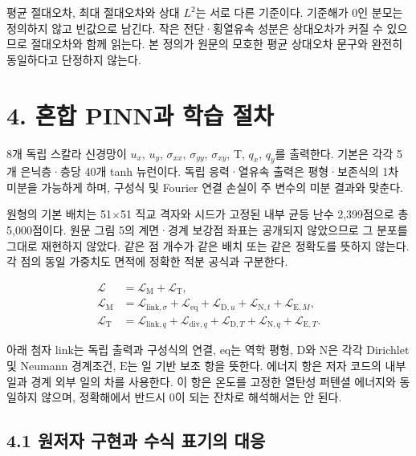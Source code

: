 \documentclass[10pt,a4paper]{article}
\begin{document}
평균 절대오차, 최대 절대오차와 상대 $L^2$는 서로 다른 기준이다. 기준해가 0인 분모는 정의하지 않고 빈값으로 남긴다. 작은 전단·횡열유속 성분은 상대오차가 커질 수 있으므로 절대오차와 함께 읽는다. 본 정의가 원문의 모호한 평균 상대오차 문구와 완전히 동일하다고 단정하지 않는다.\par

\clearpage

\section{4. 혼합 PINN과 학습 절차}

8개 독립 스칼라 신경망이 $u_x$, $u_y$, $\sigma_{xx}$, $\sigma_{yy}$, $\sigma_{xy}$, T, $q_x$, $q_y$를 출력한다. 기본은 각각 5개 은닉층·층당 40개 tanh 뉴런이다. 독립 응력·열유속 출력은 평형·보존식의 1차 미분을 가능하게 하며, 구성식 및 Fourier 연결 손실이 주 변수의 미분 결과와 맞춘다.\par

{\small\color{muted} 원형의 기본 배치는 51$\times$51 직교 격자와 시드가 고정된 내부 균등 난수 2,399점으로 총 5,000점이다. 원문 그림 5의 계면·경계 보강점 좌표는 공개되지 않았으므로 그 분포를 그대로 재현하지 않았다. 같은 점 개수가 같은 배치 또는 같은 정확도를 뜻하지 않는다. 각 점의 동일 가중치도 면적에 정확한 적분 공식과 구분한다.\par}

\begin{equation}\begin{aligned}\mathcal L&=\mathcal L_{\mathrm M}+\mathcal L_{\mathrm T},\\\mathcal L_{\mathrm M}&=\mathcal L_{\mathrm{link},\sigma}+\mathcal L_{\mathrm{eq}}+\mathcal L_{\mathrm D,u}+\mathcal L_{\mathrm N,t}+\mathcal L_{\mathrm E,M},\\\mathcal L_{\mathrm T}&=\mathcal L_{\mathrm{link},q}+\mathcal L_{\mathrm{div},q}+\mathcal L_{\mathrm D,T}+\mathcal L_{\mathrm N,q}+\mathcal L_{\mathrm E,T}.\end{aligned}\end{equation}

아래 첨자 $\mathrm{link}$는 독립 출력과 구성식의 연결, $\mathrm{eq}$는 역학 평형, $\mathrm D$와 $\mathrm N$은 각각 Dirichlet 및 Neumann 경계조건, $\mathrm E$는 일 기반 보조 항을 뜻한다. 에너지 항은 저자 코드의 내부 일과 경계 외부 일의 차를 사용한다. 이 항은 온도를 고정한 열탄성 퍼텐셜 에너지와 동일하지 않으며, 정확해에서 반드시 0이 되는 잔차로 해석해서는 안 된다.\par

\subsection{4.1 원저자 구현과 수식 표기의 대응}
\end{document}
